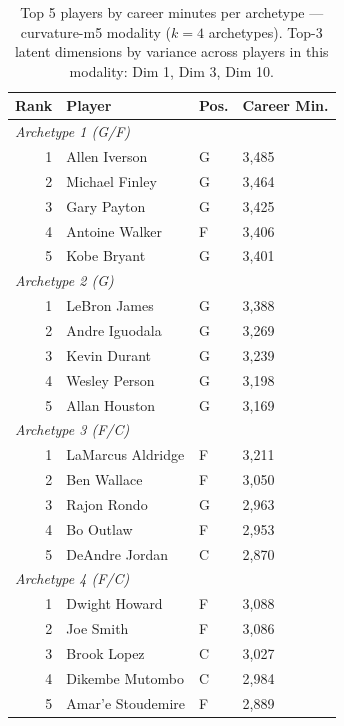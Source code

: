 \begin{table}[htbp]
  \centering\small
  \begin{tabular}{rlll}
    \toprule
    Rank & Player & Pos. & Career Min. \\
    \midrule
    \multicolumn{4}{l}{\textit{Archetype 1 (G/F)}} \\
    \midrule
    1 & Allen Iverson & G & 3,485 \\
    2 & Michael Finley & G & 3,464 \\
    3 & Gary Payton & G & 3,425 \\
    4 & Antoine Walker & F & 3,406 \\
    5 & Kobe Bryant & G & 3,401 \\
    \midrule[0.4pt]
    \multicolumn{4}{l}{\textit{Archetype 2 (G)}} \\
    \midrule
    1 & LeBron James & G & 3,388 \\
    2 & Andre Iguodala & G & 3,269 \\
    3 & Kevin Durant & G & 3,239 \\
    4 & Wesley Person & G & 3,198 \\
    5 & Allan Houston & G & 3,169 \\
    \midrule[0.4pt]
    \multicolumn{4}{l}{\textit{Archetype 3 (F/C)}} \\
    \midrule
    1 & LaMarcus Aldridge & F & 3,211 \\
    2 & Ben Wallace & F & 3,050 \\
    3 & Rajon Rondo & G & 2,963 \\
    4 & Bo Outlaw & F & 2,953 \\
    5 & DeAndre Jordan & C & 2,870 \\
    \midrule[0.4pt]
    \multicolumn{4}{l}{\textit{Archetype 4 (F/C)}} \\
    \midrule
    1 & Dwight Howard & F & 3,088 \\
    2 & Joe Smith & F & 3,086 \\
    3 & Brook Lopez & C & 3,027 \\
    4 & Dikembe Mutombo & C & 2,984 \\
    5 & Amar'e Stoudemire & F & 2,889 \\
    \bottomrule
  \end{tabular}
  \caption{Top 5 players by career minutes per archetype --- curvature-m5 modality ($k=4$ archetypes). Top-3 latent dimensions by variance across players in this modality: Dim 1, Dim 3, Dim 10.}
  \label{tab:arch_reps_curvature_m5}
\end{table}

